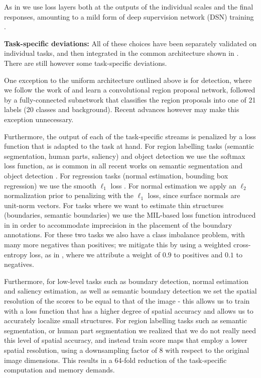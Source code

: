 \documentclass[10pt,twocolumn,letterpaper]{article}
\begin{document}
As in \cite{iclr16,ChenYWXY15} we use loss layers both at the outputs of the individual scales and  the final responses, amounting to a mild form of deep supervision network (DSN)  training \cite{hed}.


{\textbf{Task-specific deviations:}}
All of these choices have been separately validated on individual tasks, and then integrated in the common architecture shown in . 
There are still however some task-specific deviations.

 One  exception to the uniform architecture  outlined above is for detection, where we follow the work of \cite{RenHGS15} and learn a convolutional region proposal network,  followed by a fully-connected subnetwork that classifies the region proposals into one of  21 labels (20 classes and background). Recent advances however \cite{DaiLHS16,ssd}  may make this exception unnecessary.
 

Furthermore, the output of each of the task-specific streams is penalized by a loss function that is adapted to the task at hand. 
 For region labelling tasks (semantic segmentation, human parts, saliency) and object detection we use the softmax loss function, as is common in all recent works on semantic segmentation \cite{LongSD15,Chen2015iclr} and object detection \cite{Girshick15}. For regression tasks (normal estimation, bounding box regression)
 we use the smooth $\ell_1$ loss \cite{Girshick15}. For normal estimation we apply an $\ell_2$ normalization prior to penalizing with the $\ell_1$ loss, since surface normals are unit-norm vectors. 
 For tasks where we want to estimate thin structures (boundaries, semantic boundaries) we use the MIL-based loss function introduced in \cite{iclr16} in order to  accommodate imprecision in the placement of the boundary annotations. For these two tasks we also have a  class imbalance problem, with many more negatives than positives; we mitigate this by using a weighted cross-entropy loss, as in \cite{hed}, where we  attribute a weight of $0.9$ to positives and $0.1$ to negatives. 
 
Furthermore, for  low-level tasks such as boundary detection, normal estimation and saliency estimation, as well as semantic boundary detection we set the spatial resolution of the scores to be  equal to that of the image - this allows us to train with a loss function that has a higher degree of spatial accuracy and allows us to accurately localize small structures. For region labelling tasks such as semantic segmentation, or human part segmentation we realized that we do not really need this level of spatial accuracy, and instead train score maps that employ a lower spatial resolution, using a downsampling factor of 8 with respect to the original image dimensions. This results in a 64-fold reduction of  the task-specific computation and memory demands. 
\end{document}
